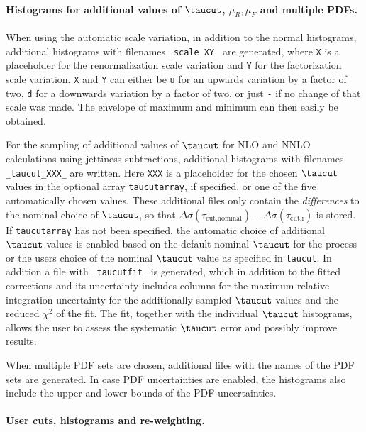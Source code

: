 \paragraph{Histograms for additional values of $\taucut$, $\mu_R,\mu_F$ and multiple PDFs.}
When using the automatic scale variation, in addition to the normal histograms, additional
histograms with filenames \texttt{\_scale\_XY\_} are generated, where \texttt{X} is a placeholder for the 
renormalization scale variation and \texttt{Y} for the factorization scale variation. \texttt{X} and \texttt{Y} can 
either be \texttt{u} for an upwards variation by a factor of two, \texttt{d} for a downwards variation by a factor of 
two, or just \texttt{-} if no change of that scale was made. The envelope of maximum and minimum can then easily be 
obtained.

For the sampling of additional values of $\taucut$ for NLO and NNLO calculations using jettiness subtractions, 
additional histograms with filenames \texttt{\_taucut\_XXX\_} are written. Here \texttt{XXX} is a placeholder for the 
chosen $\taucut$ values in the optional array \texttt{taucutarray}, if specified, or one of the five automatically 
chosen values. These additional files 
only contain the \emph{differences} to the nominal choice of 
$\taucut$, so that $\Delta\sigma(\tau_{\text{cut,nominal}}) - \Delta\sigma(\tau_{\text{cut,i}})$ is stored. If 
\texttt{taucutarray} has not 
been specified, the automatic choice of additional
$\taucut$ values is enabled based on the default nominal $\taucut$ for the process or the users choice of the nominal 
$\taucut$ value as specified in \texttt{taucut}.
In addition a file with \texttt{\_taucutfit\_} is generated, which in addition to the fitted corrections and its 
uncertainty includes columns for the maximum relative integration uncertainty for the additionally sampled $\taucut$ 
values and the 
reduced $\chi^2$ of the fit. %
The fit, together with the individual $\taucut$ 
histograms, allows the user to assess the systematic $\taucut$ error and possibly improve results.

When multiple PDF sets are chosen, additional files with the names of the PDF sets are generated. In case
PDF uncertainties are enabled, the histograms also include the upper and lower bounds of the PDF uncertainties.

\paragraph{User cuts, histograms and re-weighting.}


